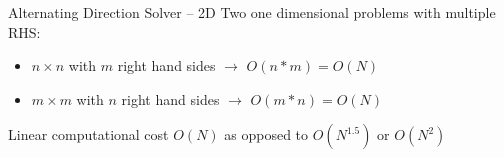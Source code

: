 \documentclass[c]{beamer}
\newcommand{\Mat}[1]{\mathbf{#1}}
\begin{document}
\begin{frame}[fragile]{Alternating Direction Solver -- 2D}
Two one dimensional problems with multiple RHS:
\begin{itemize}
\item $ n \times n $ with $m$ right hand sides $\rightarrow$ $O(n*m)=O(N)$
\item $ m \times m $ with $n$ right hand sides $\rightarrow$ $O(m*n)=O(N)$
\end{itemize}
\vspace{2mm}
Linear computational cost $O(N)$ as opposed to $O(N^{1.5})$ or $O(N^{2})$

\end{frame}



\end{document}
